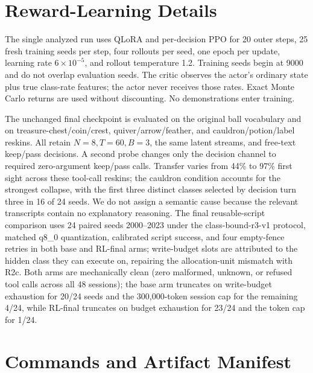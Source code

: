 \documentclass{article}
\begin{document}
\section{Reward-Learning Details}
\label{app:rl}

The single analyzed run uses QLoRA and per-decision PPO for 20 outer steps,
25 fresh training seeds per step, four rollouts per seed, one epoch per update,
learning rate $6\times10^{-5}$, and rollout temperature 1.2. Training seeds
begin at 9000 and do not overlap evaluation seeds. The critic observes the
actor's ordinary state plus true class-rate features; the actor never receives
those rates. Exact Monte Carlo returns are used without discounting. No
demonstrations enter training.

The unchanged final checkpoint is evaluated on the original ball vocabulary
and on treasure-chest/coin/crest, quiver/arrow/feather, and
cauldron/potion/label reskins. All retain $N=8,T=60,B=3$, the same latent
streams, and free-text keep/pass decisions. A second probe changes only the
decision channel to required zero-argument keep/pass calls. Transfer varies
from 44\% to 97\% first sight across these tool-call reskins; the cauldron
condition accounts for the strongest collapse, with the first three distinct
classes selected by decision turn three in 16 of 24 seeds. We do not assign a
semantic cause because the relevant transcripts contain no explanatory
reasoning. The final reusable-script comparison uses 24 paired seeds
2000--2023 under the class-bound-r3-v1 protocol, matched q8\_0 quantization,
calibrated script success, and four empty-fence retries in both base and
RL-final arms; write-budget slots are attributed to the hidden class they can
execute on, repairing the allocation-unit mismatch with R2c. Both arms are
mechanically clean (zero malformed, unknown, or refused tool calls across all
48 sessions); the base arm truncates on write-budget exhaustion for 20/24
seeds and the 300,000-token session cap for the remaining 4/24, while
RL-final truncates on budget exhaustion for 23/24 and the token cap for 1/24.

\section{Commands and Artifact Manifest}
\end{document}
